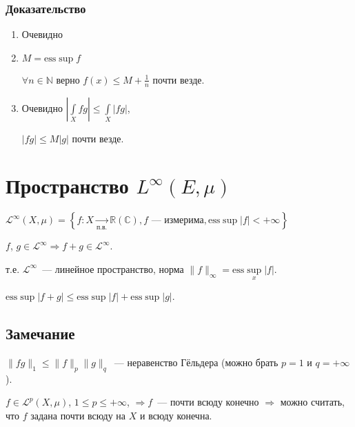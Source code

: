 \documentclass{article}
\begin{document}
            \subsubsection{Доказательство}
    
                \begin{enumerate}
        
                    \item Очевидно
            
                    \item $M = \mathrm{ess}\sup f$
            
                        $\forall n \in \mathbb{N}$ верно $f(x) \leqslant M + \frac{1}{n}$ почти везде.
            
                    \item Очевидно $\left| \int\limits_X fg \right| \leqslant \int\limits_X |fg|$,
            
                        $|fg| \leqslant M|g|$ почти везде.
            
                \end{enumerate}
        
    \newpage
    
    \section{Пространство $L^\infty(E,\mu)$}
        
        $\mathcal{L}^{\infty} (X, \mu) = \left\{ f : X \xrightarrow[\text{п.в.}]{} \mathbb{R} (\mathbb{C}), f \text{~--- измерима}, \mathrm{ess}\sup |f| < +\infty \right\}$
    
        $f$, $g \in \mathcal{L}^{\infty} \Rightarrow f + g \in \mathcal{L}^{\infty}$.
    
        т.е. $\mathcal{L}^{\infty}$~--- линейное пространство, норма $\| f \|_{\infty} = \mathrm{ess}\sup\limits_x |f|$.
    
        $\mathrm{ess}\sup |f + g| \leqslant \mathrm{ess}\sup |f| + \mathrm{ess}\sup |g|$.
    
        \subsection{Замечание}
    
            $\| fg \|_1 \leqslant \| f \|_p \| g \|_q$~--- неравенство Гёльдера (можно брать $p = 1$ и $q = +\infty$).
        
            $f \in \mathcal{L}^p (X, \mu)$, $1 \leqslant p \leqslant +\infty$, $\Rightarrow f$~--- почти всюду конечно $\Rightarrow$ можно считать, что $f$ задана почти всюду на $X$ и всюду конечна.
    
\end{document}

